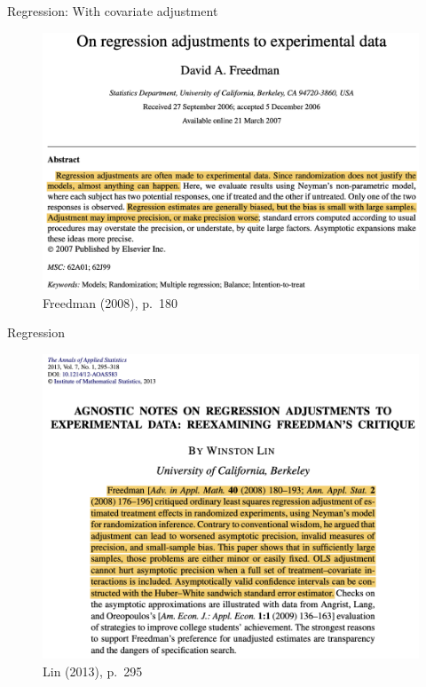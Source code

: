 \documentclass[table, xcolor = {dvipsnames}, 9pt]{beamer}
\theoremstyle{plain}
\begin{document}
\begin{frame}{Regression: With covariate adjustment} \vfill
\begin{figure}[H]
\includegraphics[width=0.9\linewidth]{images/Freedman_2008.png}
\caption{Freedman (2008), p.~180}
\end{figure}
\end{frame}
\begin{frame}{Regression} \vfill
\begin{figure}[H]
\includegraphics[width=0.9\linewidth]{images/Lin_2013.png}
\caption{Lin (2013), p.~295}
\end{figure}
\end{frame}
\end{document}
